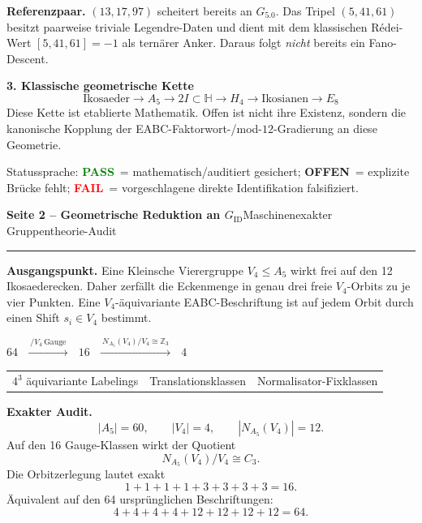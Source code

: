 \documentclass[10pt,a4paper]{article}
\newcommand{\PASS}{\textcolor{green}{\textbf{PASS}}}
\newcommand{\OPEN}{\textcolor{amber}{\textbf{OFFEN}}}
\newcommand{\FAIL}{\textcolor{red}{\textbf{FAIL}}}
\begin{document}
\begin{statusbox}
\textbf{Referenzpaar.} $(13,17,97)$ scheitert bereits an $G_{5.0}$. Das Tripel $(5,41,61)$ besitzt paarweise triviale Legendre-Daten und dient mit dem klassischen Rédei-Wert $[5,41,61]=-1$ als ternärer Anker. Daraus folgt \emph{nicht} bereits ein Fano-Descent.
\end{statusbox}

\textbf{3. Klassische geometrische Kette}
\[
\boxed{
\text{Ikosaeder}\to A_5\to 2I\subset\mathbb H\to H_4\to\text{Ikosianen}\to E_8
}
\]
Diese Kette ist etablierte Mathematik. Offen ist nicht ihre Existenz, sondern die kanonische Kopplung der EABC-Faktorwort-/mod-$12$-Gradierung an diese Geometrie.

\vfill
{\footnotesize Statussprache: \PASS\ = mathematisch/auditiert gesichert; \OPEN\ = explizite Brücke fehlt; \FAIL\ = vorgeschlagene direkte Identifikation falsifiziert.}

\newpage

{\Large\bfseries Seite 2 -- Geometrische Reduktion an $G_{\mathrm{ID}}$}\hfill{\small Maschinenexakter Gruppentheorie-Audit}
\vspace{2mm}
\hrule
\vspace{3mm}

\begin{proofbox}
\textbf{Ausgangspunkt.} Eine Kleinsche Vierergruppe $V_4\le A_5$ wirkt frei auf den 12 Ikosaederecken. Daher zerfällt die Eckenmenge in genau drei freie $V_4$-Orbits zu je vier Punkten. Eine $V_4$-äquivariante EABC-Beschriftung ist auf jedem Orbit durch einen Shift $s_i\in V_4$ bestimmt.
\end{proofbox}

\begin{center}
\vspace{1mm}
{\Large\bfseries
$\boxed{64}$
$\;\xrightarrow{\ /V_4\ \text{Gauge}\ }\;$
$\boxed{16}$
$\;\xrightarrow{\ N_{A_5}(V_4)/V_4\cong\mathbb Z_3\ }\;$
$\boxed{4}$}
\vspace{2mm}

\small
\begin{tabular}{c@{\qquad}c@{\qquad}c}
$4^3$ äquivariante Labelings & Translationsklassen & Normalisator-Fixklassen\\
\end{tabular}
\end{center}

\vspace{3mm}
\textbf{Exakter Audit.}
\[
|A_5|=60,\qquad |V_4|=4,\qquad |N_{A_5}(V_4)|=12.
\]
Auf den 16 Gauge-Klassen wirkt der Quotient
\[
N_{A_5}(V_4)/V_4\cong C_3.
\]
Die Orbitzerlegung lautet exakt
\[
\boxed{1+1+1+1+3+3+3+3=16.}
\]
Äquivalent auf den 64 ursprünglichen Beschriftungen:
\[
\boxed{4+4+4+4+12+12+12+12=64.}
\]
\end{document}
